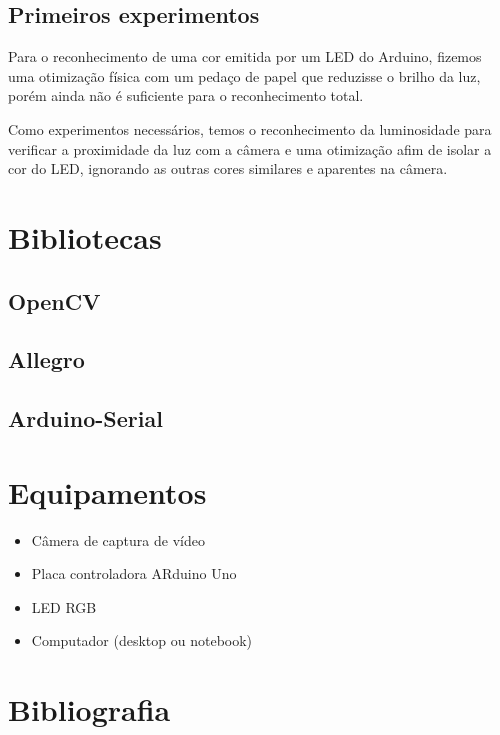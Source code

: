 \documentclass[12pt]{article}
\begin{document}
\subsection{Primeiros experimentos}
Para o reconhecimento de uma cor emitida por um LED do Arduino, fizemos uma otimiza\c c\~ao f\'isica
com um peda\c co de papel que reduzisse o brilho da luz, por\'em ainda n\~ao \'e suficiente para
o reconhecimento total.

Como experimentos necess\'arios, temos o reconhecimento da luminosidade para verificar
a proximidade da luz com a c\^amera e uma otimiza\c c\~ao afim de isolar a cor do LED,
ignorando as outras cores similares e aparentes na c\^amera.

\section{Bibliotecas}
\subsection{OpenCV}
\subsection{Allegro}
\subsection{Arduino-Serial}

\section{Equipamentos}
\begin{itemize}
\item C\^amera de captura de v\'ideo
\item Placa controladora ARduino Uno
\item LED RGB
\item Computador (desktop ou notebook)
\end{itemize}

\nocite{*}

\section{Bibliografia}


\end{document}

